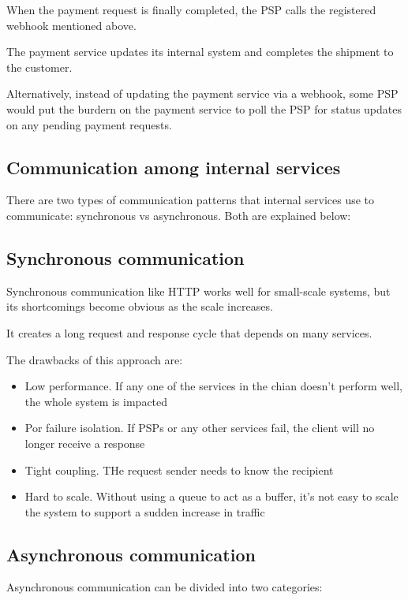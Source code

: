 \documentclass{report}
\theoremstyle{definition}
\let\oldsubsection\subsection
\renewcommand{\subsection}{\oldsubsection*}
\begin{document}
When the payment request is finally completed, the PSP calls the registered webhook mentioned above.

The payment service updates its internal system and completes the shipment to the customer.

Alternatively, instead of updating the payment service via a webhook, some PSP would put the burdern on the payment service to poll the PSP for status updates on any pending payment requests.

\subsection{Communication among internal services}

There are two types of communication patterns that internal services use to communicate: synchronous vs asynchronous. Both are explained below:

\subsection{Synchronous communication}

Synchronous communication like HTTP works well for small-scale systems, but its shortcomings become obvious as the scale increases.

It creates a long request and response cycle that depends on many services.

The drawbacks of this approach are:

\begin{itemize}
\item
Low performance. If any one of the services in the chian doesn't perform well, the whole system is impacted
\item
Por failure isolation. If PSPs or any other services fail, the client will no longer receive a response
\item
Tight coupling. THe request sender needs to know the recipient
\item
Hard to scale. Without using a queue to act as a buffer, it's not easy to scale the system to support a sudden increase in traffic
\end{itemize}

\subsection{Asynchronous communication}

Asynchronous communication can be divided into two categories:
\end{document}
